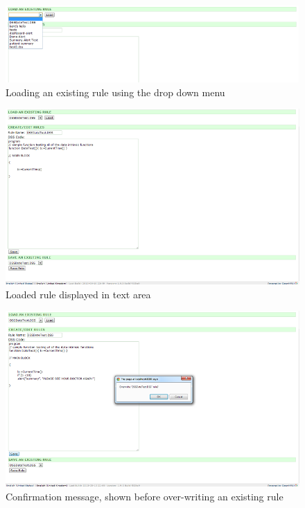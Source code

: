 \documentclass[12pt,letterpaper]{article}
\begin{document}
\begin{figure}\begin{center}
\includegraphics[width=6.5in]{user_guide/load_rule.png}
\end{center}
\caption{Loading an existing rule using the drop down menu}
\label{fig:LOAD_RULE}
\end{figure}

\begin{figure}\begin{center}
\includegraphics[width=6.5in]{user_guide/load_rule_shown.png}
\end{center}
\caption{Loaded rule displayed in text area}
\label{fig:LOAD_RULE_SHOWN}
\end{figure}

\begin{figure}\begin{center}
\includegraphics[width=6.5in]{user_guide/modify_confirmation.png}
\end{center}
\caption{Confirmation message, shown before over-writing an existing rule}
\label{fig:MODIFY_CONFIRMATION}
\end{figure}
\end{document}
